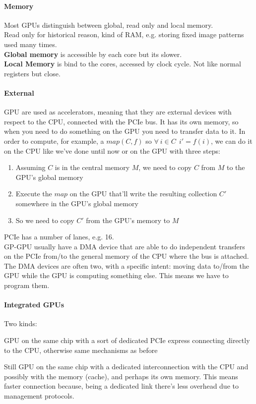 \documentclass[10pt]{report}
\begin{document}
\paragraph{Memory} Most GPUs distinguish between global, read only and local memory.\\
Read only for historical reason, kind of RAM, e.g. storing fixed image patterns used many times.\\
\textbf{Global memory} is accessible by each core but its slower.\\
\textbf{Local Memory} is bind to the cores, accessed by clock cycle. Not like normal registers but close.
\paragraph{External} GPU are used as accelerators, meaning that they are external devices with respect to the CPU, connected with the PCIe bus. It has its own memory, so when you need to do something on the GPU you need to transfer data to it. In order to compute, for example, a $map(C,f)$ so $\forall\:i\in C\:\:i'=f(i)$, we can do it on the CPU like we've done until now or on the GPU with three steps:
\begin{enumerate}
	\item Assuming $C$ is in the central memory $M$, we need to copy $C$ from $M$ to the GPU's global memory
	\item Execute the $map$ on the GPU that'll write the resulting collection $C'$ somewhere in the GPU's global memory
	\item So we need to copy $C'$ from the GPU's memory to $M$
\end{enumerate}
PCIe has a number of lanes, e.g. 16.\\
GP-GPU usually have a DMA device that are able to do independent transfers on the PCIe from/to the general memory of the CPU where the bus is attached. The DMA devices are often two, with a specific intent: moving data to/from the GPU while the GPU is computing something else. This means we have to program them.
\paragraph{Integrated GPUs} Two kinds:
\begin{list}{}{}
	\item GPU on the same chip with a sort of dedicated PCIe express connecting directly to the CPU, otherwise same mechanisms as before
	\item Still GPU on the same chip with a dedicated interconnection with the CPU and possibly with the memory (cache), and perhaps its own memory. This means faster connection because, being a dedicated link there's less overhead due to management protocols.
\end{list}
\end{document}
